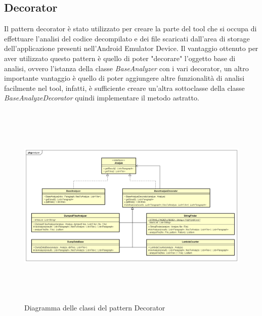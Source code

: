 \subsection*{Decorator}\label{subsec:decorator}
Il pattern decorator è stato utilizzato per creare la parte del tool che si occupa di effettuare l'analisi del codice decompilato e dei file scaricati dall'area di storage dell'applicazione presenti nell'Android Emulator Device.
Il vantaggio ottenuto per aver utilizzato questo pattern è quello di poter "decorare" l'oggetto base di analisi, ovvero l'istanza della classe \textit{BaseAnalyzer} con i vari decorator, un altro importante vantaggio è quello di poter aggiungere altre funzionalità di analisi facilmente nel tool, infatti, è sufficiente creare un'altra sottoclasse della classe \textit{BaseAnalyzeDecorator} quindi implementare il metodo astratto.
\begin{figure}[H]
    \centering
    \includegraphics[width=13cm, height=10cm]{./immagini/diagrammi_uml/Decorator.png}
    \caption{Diagramma delle classi del pattern Decorator}\label{fig:decorator}
\end{figure}

